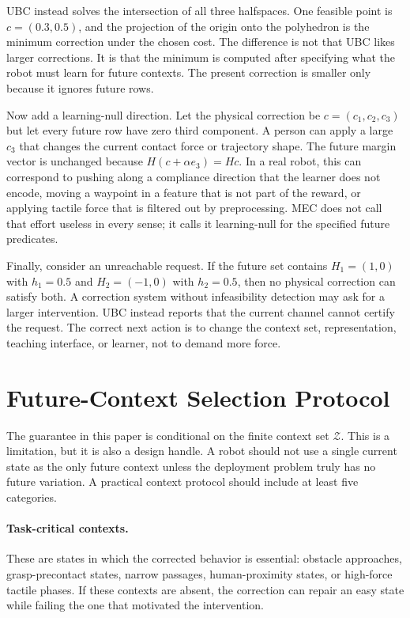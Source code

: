 \documentclass{article}
\begin{document}
UBC instead solves the intersection of all three halfspaces. One feasible point
is $c=(0.3,0.5)$, and the projection of the origin onto the polyhedron is the
minimum correction under the chosen cost. The difference is not that UBC likes
larger corrections. It is that the minimum is computed after specifying what the
robot must learn for future contexts. The present correction is smaller only
because it ignores future rows.

Now add a learning-null direction. Let the physical correction be
$c=(c_1,c_2,c_3)$ but let every future row have zero third component. A person
can apply a large $c_3$ that changes the current contact force or trajectory
shape. The future margin vector is unchanged because $H(c+\alpha e_3)=Hc$. In a
real robot, this can correspond to pushing along a compliance direction that the
learner does not encode, moving a waypoint in a feature that is not part of the
reward, or applying tactile force that is filtered out by preprocessing. MEC
does not call that effort useless in every sense; it calls it learning-null for
the specified future predicates.

Finally, consider an unreachable request. If the future set contains
$H_1=(1,0)$ with $h_1=0.5$ and $H_2=(-1,0)$ with $h_2=0.5$, then no physical
correction can satisfy both. A correction system without infeasibility detection
may ask for a larger intervention. UBC instead reports that the current channel
cannot certify the request. The correct next action is to change the context
set, representation, teaching interface, or learner, not to demand more force.

\section{Future-Context Selection Protocol}

The guarantee in this paper is conditional on the finite context set
$\mathcal{Z}$. This is a limitation, but it is also a design handle. A robot
should not use a single current state as the only future context unless the
deployment problem truly has no future variation. A practical context protocol
should include at least five categories.

\paragraph{Task-critical contexts.}
These are states in which the corrected behavior is essential: obstacle
approaches, grasp-precontact states, narrow passages, human-proximity states,
or high-force tactile phases. If these contexts are absent, the correction can
repair an easy state while failing the one that motivated the intervention.
\end{document}
